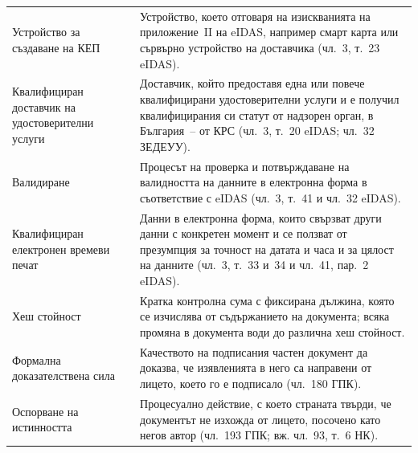 {\begin{longtable}{@{}T{4.1cm}L{12.45cm}@{}}
Устройство за създаване на КЕП & Устройство, което отговаря на изискванията на
приложение~II на eIDAS, например смарт карта или сървърно устройство на доставчика
(чл.~3, т.~23 eIDAS).\\
Квалифициран доставчик на удостоверителни услуги & Доставчик, който предоставя една или
повече квалифицирани удостоверителни услуги и е получил квалифицирания си статут от
надзорен орган, в България~-- от КРС (чл.~3, т.~20 eIDAS; чл.~32 ЗЕДЕУУ).\\
Валидиране & Процесът на проверка и потвърждаване на валидността на данните в електронна
форма в съответствие с eIDAS (чл.~3, т.~41 и чл.~32 eIDAS).\\
Квалифициран електронен времеви печат & Данни в електронна форма, които свързват други
данни с конкретен момент и се ползват от презумпция за точност на датата и часа и за
цялост на данните (чл.~3, т.~33 и~34 и чл.~41, пар.~2 eIDAS).\\
Хеш стойност & Кратка контролна сума с фиксирана дължина, която се изчислява от
съдържанието на документа; всяка промяна в документа води до различна хеш стойност.\\
Формална доказателствена сила & Качеството на подписания частен документ да доказва, че
изявленията в него са направени от лицето, което го е подписало (чл.~180 ГПК).\\
Оспорване на истинността & Процесуално действие, с което страната твърди, че документът не
изхожда от лицето, посочено като негов автор (чл.~193 ГПК; вж. чл.~93, т.~6 НК).\\
\end{longtable}
}
\addtocounter{table}{-1}
